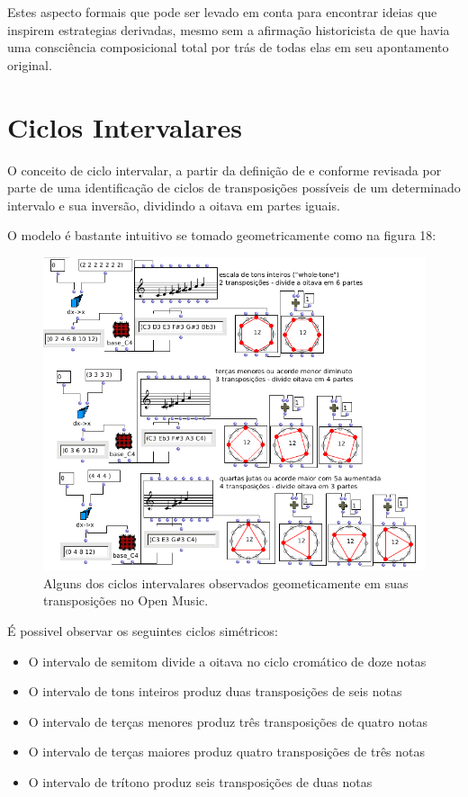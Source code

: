 \documentclass[
	12pt,				%
	openright,			%
	twoside,			%
	a4paper,			%
	english,			%
	french,				%
	spanish,			%
	brazil				%
	]{abntex2}
\begin{document}
Estes aspecto formais que pode ser levado em conta para encontrar ideias que inspirem estrategias derivadas, mesmo sem a afirmação historicista de que havia uma consciência composicional total por trás de todas elas em seu apontamento original.


\section{Ciclos Intervalares}
\label{ciclos}

O conceito de ciclo intervalar, a partir da definição de  e conforme revisada por  parte de uma identificação de ciclos de transposições possíveis de um determinado intervalo e sua inversão, dividindo a oitava em partes iguais.

O modelo é bastante intuitivo se tomado geometricamente como na figura 18:

\begin{figure}[!h]
	\caption{\label{fig_grafico}Alguns dos ciclos intervalares observados geometicamente em suas transposições no Open Music.  }
	\begin{center}
	    \includegraphics[scale=0.5]{ciclos/ciclosOM.png}
	\end{center}
\end{figure}

É possivel observar os seguintes ciclos simétricos:

\begin{itemize}
\item O intervalo de semitom divide a oitava no ciclo cromático de doze notas
\item O intervalo de tons inteiros produz duas transposições de seis notas
\item O intervalo de terças menores produz três transposições de quatro notas
\item O intervalo de terças maiores produz quatro transposições de três notas
\item O intervalo de trítono produz seis transposições de duas notas
\end{itemize}
\end{document}

